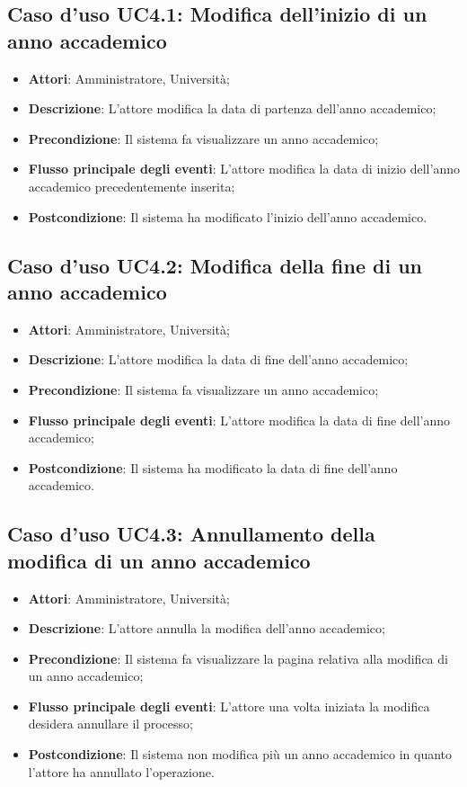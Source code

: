 \subsection{Caso d'uso \texorpdfstring{UC4.1}{UC4.1}: Modifica dell'inizio di un anno accademico}
\begin{itemize}
	\item \textbf{Attori}: Amministratore, Università;
	\item \textbf{Descrizione}: L'attore modifica la data di partenza dell'anno accademico;
	\item \textbf{Precondizione}: Il sistema fa visualizzare un anno accademico;
	\item \textbf{Flusso principale degli eventi}: L'attore modifica la data di inizio dell'anno accademico precedentemente inserita;
	\item \textbf{Postcondizione}: Il sistema ha modificato l'inizio dell'anno accademico.
\end{itemize}
\subsection{Caso d'uso \texorpdfstring{UC4.2}{UC4.2}: Modifica della fine di un anno accademico}
\begin{itemize}
	\item \textbf{Attori}: Amministratore, Università;
	\item \textbf{Descrizione}: L'attore modifica la data di fine dell'anno accademico;
	\item \textbf{Precondizione}: Il sistema fa visualizzare un anno accademico;
	\item \textbf{Flusso principale degli eventi}: L'attore modifica la data di fine dell'anno accademico;
	\item \textbf{Postcondizione}: Il sistema ha modificato la data di fine dell'anno accademico.
\end{itemize}
\subsection{Caso d'uso \texorpdfstring{UC4.3}{UC4.3}: Annullamento della modifica di un anno accademico}
\begin{itemize}
	\item \textbf{Attori}: Amministratore, Università;
	\item \textbf{Descrizione}: L'attore annulla la modifica dell'anno accademico;
	\item \textbf{Precondizione}: Il sistema fa visualizzare la pagina relativa alla modifica di un anno accademico;
	\item \textbf{Flusso principale degli eventi}: L'attore una volta iniziata la modifica desidera annullare il processo;
	\item \textbf{Postcondizione}: Il sistema non modifica più un anno accademico in quanto l'attore ha annullato l'operazione.
\end{itemize}

